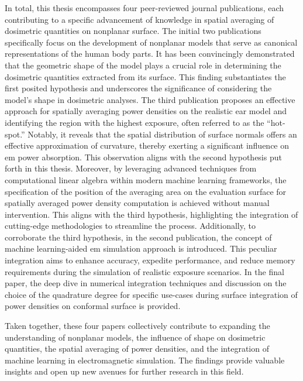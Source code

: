 In total, this thesis encompasses four peer-reviewed journal publications, each contributing to a specific advancement of knowledge in spatial averaging of dosimetric quantities on nonplanar surface.
The initial two publications specifically focus on the development of nonplanar models that serve as canonical representations of the human body parts.
It has been convincingly demonstrated that the geometric shape of the model plays a crucial role in determining the dosimetric quantities extracted from its surface.
This finding substantiates the first posited hypothesis and underscores the significance of considering the model's shape in dosimetric analyses.
The third publication proposes an effective approach for spatially averaging power densities on the realistic ear model and identifying the region with the highest exposure, often referred to as the ``hot-spot.''
Notably, it reveals that the spatial distribution of surface normals offers an effective approximation of curvature, thereby exerting a significant influence on \gls{em} power absorption.
This observation aligns with the second hypothesis put forth in this thesis.
Moreover, by leveraging advanced techniques from computational linear algebra within modern machine learning frameworks, the specification of the position of the averaging area on the evaluation surface for spatially averaged power density computation is achieved without manual intervention.
This aligns with the third hypothesis, highlighting the integration of cutting-edge methodologies to streamline the process.
Additionally, to corroborate the third hypothesis, in the second publication, the concept of machine learning-aided \gls{em} simulation approach is introduced.
This peculiar integration aims to enhance accuracy, expedite performance, and reduce memory requirements during the simulation of realistic exposure scenarios.
In the final paper, the deep dive in numerical integration techniques and discussion on the choice of the quadrature degree for specific use-cases during surface integration of power densities on conformal surface is provided.

Taken together, these four papers collectively contribute to expanding the understanding of nonplanar models, the influence of shape on dosimetric quantities, the spatial averaging of power densities, and the integration of machine learning in electromagnetic simulation.
The findings provide valuable insights and open up new avenues for further research in this field.
